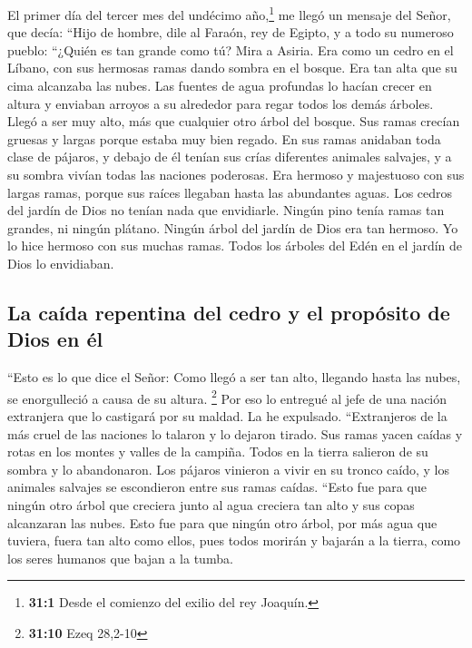  El primer día del tercer mes del undécimo año,\footnote{\textbf{31:1}
  Desde el comienzo del exilio del rey Joaquín.} me llegó un mensaje del
Señor, que decía:  ``Hijo de hombre, dile al Faraón, rey
de Egipto, y a todo su numeroso pueblo: ``¿Quién es tan grande como tú?
 Mira a Asiria. Era como un cedro en el Líbano, con sus
hermosas ramas dando sombra en el bosque. Era tan alta que su cima
alcanzaba las nubes.  Las fuentes de agua profundas lo
hacían crecer en altura y enviaban arroyos a su alrededor para regar
todos los demás árboles.  Llegó a ser muy alto, más que
cualquier otro árbol del bosque. Sus ramas crecían gruesas y largas
porque estaba muy bien regado.  En sus ramas anidaban toda
clase de pájaros, y debajo de él tenían sus crías diferentes animales
salvajes, y a su sombra vivían todas las naciones poderosas.
 Era hermoso y majestuoso con sus largas ramas, porque sus
raíces llegaban hasta las abundantes aguas.  Los cedros
del jardín de Dios no tenían nada que envidiarle. Ningún pino tenía
ramas tan grandes, ni ningún plátano. Ningún árbol del jardín de Dios
era tan hermoso.  Yo lo hice hermoso con sus muchas ramas.
Todos los árboles del Edén en el jardín de Dios lo envidiaban.

\hypertarget{la-cauxedda-repentina-del-cedro-y-el-propuxf3sito-de-dios-en-uxe9l}{%
\subsection{La caída repentina del cedro y el propósito de Dios en
él}\label{la-cauxedda-repentina-del-cedro-y-el-propuxf3sito-de-dios-en-uxe9l}}

 ``Esto es lo que dice el Señor: Como llegó a ser tan
alto, llegando hasta las nubes, se enorgulleció a causa de su altura.
\footnote{\textbf{31:10} Ezeq 28,2-10}  Por eso lo
entregué al jefe de una nación extranjera que lo castigará por su
maldad. La he expulsado.  ``Extranjeros de la más cruel
de las naciones lo talaron y lo dejaron tirado. Sus ramas yacen caídas y
rotas en los montes y valles de la campiña. Todos en la tierra salieron
de su sombra y lo abandonaron.  Los pájaros vinieron a
vivir en su tronco caído, y los animales salvajes se escondieron entre
sus ramas caídas.  ``Esto fue para que ningún otro árbol
que creciera junto al agua creciera tan alto y sus copas alcanzaran las
nubes. Esto fue para que ningún otro árbol, por más agua que tuviera,
fuera tan alto como ellos, pues todos morirán y bajarán a la tierra,
como los seres humanos que bajan a la tumba.

